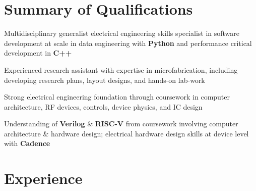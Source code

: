 \documentclass[]{chandan-cv}
\begin{document}
\begin{minipage}[t]{0.78\textwidth}


\section{Summary of Qualifications}
\runsubsection{ }
\descript{ }
\location{ }
\vspace{\topsep} %
\begin{tightemize}
	\item Multidisciplinary generalist electrical engineering skills specialist in software development at scale in data engineering with \textbf{Python} and performance critical development in \textbf{C++}
	\item Experienced research assistant with expertise in  microfabrication, including developing research plans, layout designs, and hands-on lab-work
	\item Strong electrical engineering foundation through coursework in computer architecture, RF devices, controls, device physics, and IC design
	\item Understanding of \textbf{Verilog} \& \textbf{RISC-V} from coursework involving
	computer architecture \& hardware design; electrical hardware design skills at device level with \textbf{Cadence}
\end{tightemize}
\sectionsep


\section{Experience}


\end{minipage}
\end{document}
